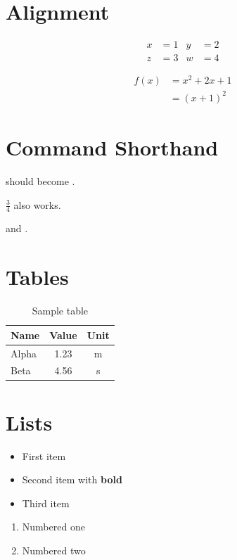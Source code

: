 \documentclass{article}
\begin{document}
\section{Alignment}

\begin{align}
  x & = 1 & y & = 2 \\
  z & = 3 & w & = 4
\end{align}

\begin{align*}
  f(x) & = x^{2} + 2x + 1 \\
       & = (x+1)^{2}
\end{align*}

\section{Command Shorthand}

 should become .

$\frac{3}{4}$ also works.

 and .

\section{Tables}

\begin{table}[h]
  \centering
  \begin{tabular}{lcc}
    \toprule
    Name  & Value & Unit \\
    \midrule
    Alpha & 1.23  & m \\
    Beta  & 4.56  & s \\
    \bottomrule
  \end{tabular}
  \caption{Sample table}
  \label{tab:sample}
\end{table}

\section{Lists}

\begin{itemize}
  \item First item
  \item Second item with \textbf{bold}
  \item Third item
\end{itemize}

\begin{enumerate}
  \item Numbered one
  \item Numbered two
\end{enumerate}
\end{document}
